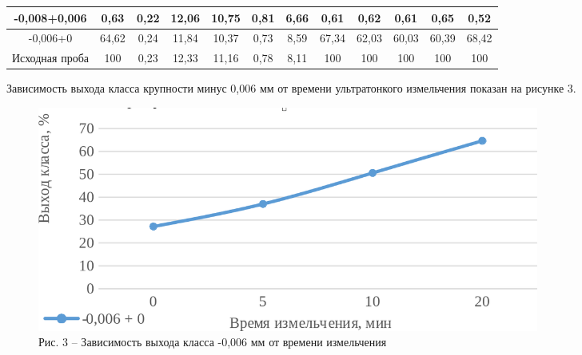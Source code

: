 {\begin{longtable}[c]{|p{}ccccccccccc|}
\multicolumn{1}{|c|}{-0,008+0,006} & \multicolumn{1}{c|}{0,63} & \multicolumn{1}{c|}{0,22} & \multicolumn{1}{c|}{12,06} & \multicolumn{1}{c|}{10,75} & \multicolumn{1}{c|}{0,81} & \multicolumn{1}{c|}{6,66} & \multicolumn{1}{c|}{0,61} & \multicolumn{1}{c|}{0,62} & \multicolumn{1}{c|}{0,61} & \multicolumn{1}{c|}{0,65} & 0,52 \\ \hline
\multicolumn{1}{|c|}{-0,006+0} & \multicolumn{1}{c|}{64,62} & \multicolumn{1}{c|}{0,24} & \multicolumn{1}{c|}{11,84} & \multicolumn{1}{c|}{10,37} & \multicolumn{1}{c|}{0,73} & \multicolumn{1}{c|}{8,59} & \multicolumn{1}{c|}{67,34} & \multicolumn{1}{c|}{62,03} & \multicolumn{1}{c|}{60,03} & \multicolumn{1}{c|}{60,39} & 68,42 \\ \hline
\multicolumn{1}{|c|}{Исходная проба} & \multicolumn{1}{c|}{100} & \multicolumn{1}{c|}{0,23} & \multicolumn{1}{c|}{12,33} & \multicolumn{1}{c|}{11,16} & \multicolumn{1}{c|}{0,78} & \multicolumn{1}{c|}{8,11} & \multicolumn{1}{c|}{100} & \multicolumn{1}{c|}{100} & \multicolumn{1}{c|}{100} & \multicolumn{1}{c|}{100} & 100 \\ \hline
\end{longtable}}

Зависимость выхода класса крупности минус 0,006 мм от времени
ультратонкого измельчения показан на рисунке 3.

\begin{figure}[H]
	\centering
	\includegraphics[width=0.8\textwidth]{assets/300.1}
	\caption*{Рис. 3 -- Зависимость выхода класса -0,006 мм от времени измельчения}
\end{figure}

